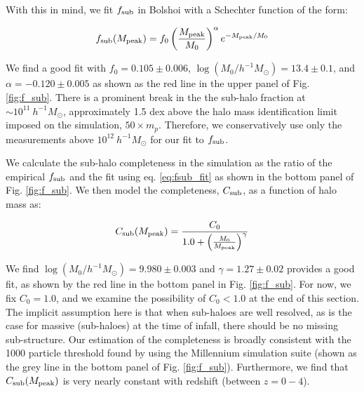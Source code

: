 \documentclass[a4paper,fleqn,usenatbib]{mnras}
\begin{document}
With this in mind, we fit $f_{\rm sub}$ in Bolshoi with a Schechter function of the form:
%
\begin{linenomath}
\begin{equation}
\label{eq:fsub_fit}
f_{\rm sub}(M_{\rm peak}) = f_0 \left( \frac{M_{\rm peak}}{M_0} \right)^{\alpha}e^{-M_{\rm peak}/M_0}
\end{equation}
\end{linenomath}
%
We find a good fit with $f_0 = 0.105 \pm 0.006$, $\log(M_0/h^{-1}M_{\odot}) = 13.4 \pm 0.1$, and $\alpha = -0.120 \pm 0.005$ as shown as the red line in the upper panel of Fig. \ref{fig:f_sub}.  There is a prominent break in the the sub-halo fraction at $\sim 10^{11} ~ h^{-1}M_{\odot}$, approximately 1.5 dex above the halo mass identification limit imposed on the simulation, $50 \times m_{p}$.  Therefore, we conservatively use only the measurements above $10^{12}~h^{-1}M_{\odot}$ for our fit to $f_{\rm sub}$.  

We calculate the sub-halo completeness in the simulation as the ratio of the empirical $f_{\rm sub}$ and the fit using eq. \ref{eq:fsub_fit} as shown in the bottom panel of Fig. \ref{fig:f_sub}.  We then model the completeness, $C_{\rm sub}$, as a function of halo mass as:
%
\begin{linenomath}
\begin{equation}
\label{eq:sub_completeness}
C_{\rm sub}(M_{\rm peak}) = \frac{C_0}{1.0 + \left(\frac{M_0}{M_{\rm peak}}\right)^{\gamma}}
\end{equation}
\end{linenomath}
%
We find $\log(M_0/h^{-1}M_{\odot})=9.980\pm0.003$ and $\gamma=1.27 \pm 0.02$ provides a good fit, as shown by the red line in the bottom panel in Fig. \ref{fig:f_sub}.  For now, we fix $C_0=1.0$, and we examine the possibility of $C_0<1.0$ at the end of this section.  The implicit assumption here is that when sub-haloes are well resolved, as is the case for massive (sub-haloes) at the time of infall, there should be no missing sub-structure.  Our estimation of the completeness is broadly consistent with the 1000 particle threshold found by \citet{Guo:2013fm} using the Millennium simulation suite (shown as the grey line in the bottom panel of Fig. \ref{fig:f_sub}).  Furthermore, we find that $C_{\rm sub}(M_{\rm peak})$ is very nearly constant with redshift (between $z=0-4$).  
\end{document}
